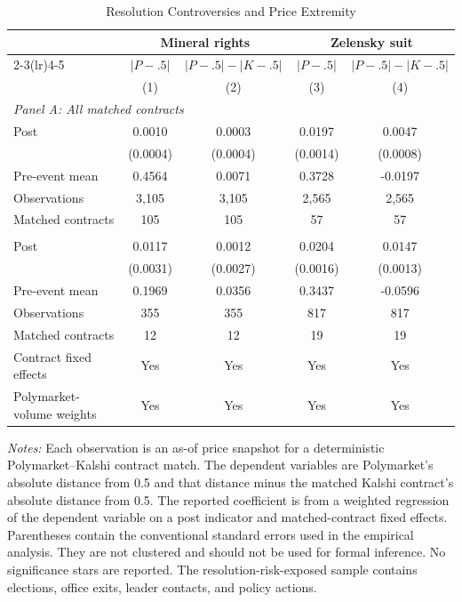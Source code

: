 \documentclass[11pt]{article}
\begin{document}
\begin{table}[!htbp]
\centering
\caption{Resolution Controversies and Price Extremity}
\label{tab:results}
\begin{threeparttable}
\small
\begin{tabular*}{\textwidth}{@{\extracolsep{\fill}}lcccc}
\toprule
& \multicolumn{2}{c}{Mineral rights} & \multicolumn{2}{c}{Zelensky suit} \\
\cmidrule(lr){2-3}\cmidrule(lr){4-5}
& $|P-.5|$ & $|P-.5|-|K-.5|$ & $|P-.5|$ & $|P-.5|-|K-.5|$ \\
& (1) & (2) & (3) & (4) \\
\midrule
\multicolumn{5}{l}{\textit{Panel A: All matched contracts}} \\
Post
    & 0.0010 & 0.0003 & 0.0197 & 0.0047 \\
    & (0.0004) & (0.0004) & (0.0014) & (0.0008) \\
Pre-event mean
    & 0.4564 & 0.0071 & 0.3728 & -0.0197 \\
Observations
    & 3,105 & 3,105 & 2,565 & 2,565 \\
Matched contracts
    & 105 & 105 & 57 & 57 \\
\addlinespace
\multicolumn{5}{l}{\textit{Panel B: Resolution-risk-exposed contracts}} \\
Post
    & 0.0117 & 0.0012 & 0.0204 & 0.0147 \\
    & (0.0031) & (0.0027) & (0.0016) & (0.0013) \\
Pre-event mean
    & 0.1969 & 0.0356 & 0.3437 & -0.0596 \\
Observations
    & 355 & 355 & 817 & 817 \\
Matched contracts
    & 12 & 12 & 19 & 19 \\
\midrule
Contract fixed effects & Yes & Yes & Yes & Yes \\
Polymarket-volume weights & Yes & Yes & Yes & Yes \\
\bottomrule
\end{tabular*}
\begin{tablenotes}[flushleft]
\footnotesize
\item \textit{Notes:} Each observation is an as-of price snapshot for a deterministic
Polymarket--Kalshi contract match. The dependent variables are Polymarket's absolute distance
from 0.5 and that distance minus the matched Kalshi contract's absolute distance from 0.5.
The reported coefficient is from a weighted regression of the dependent variable on a post
indicator and matched-contract fixed effects. Parentheses contain the conventional standard
errors used in the empirical analysis. They are not clustered and should not be used for
formal inference. No significance stars are reported. The resolution-risk-exposed sample
contains elections, office exits, leader contacts, and policy actions.
\end{tablenotes}
\end{threeparttable}
\end{table}
\end{document}
